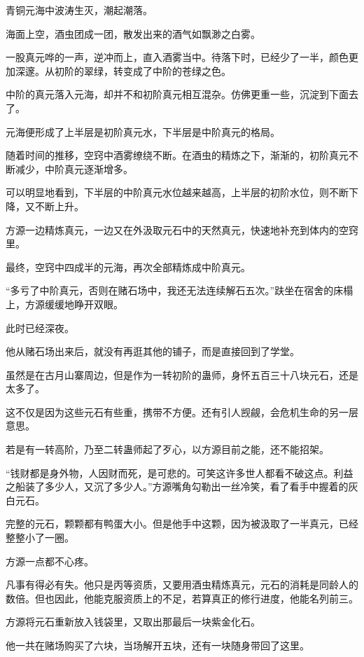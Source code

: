 
\begin{this_body}

青铜元海中波涛生灭，潮起潮落。

海面上空，酒虫团成一团，散发出来的酒气如飘渺之白雾。

一股真元哗的一声，逆冲而上，直入酒雾当中。待落下时，已经少了一半，颜色更加深邃。从初阶的翠绿，转变成了中阶的苍绿之色。

中阶的真元落入元海，却并不和初阶真元相互混杂。仿佛更重一些，沉淀到下面去了。

元海便形成了上半层是初阶真元水，下半层是中阶真元的格局。

随着时间的推移，空窍中酒雾缭绕不断。在酒虫的精炼之下，渐渐的，初阶真元不断减少，中阶真元逐渐增多。

可以明显地看到，下半层的中阶真元水位越来越高，上半层的初阶水位，则不断下降，又不断上升。

方源一边精炼真元，一边又在外汲取元石中的天然真元，快速地补充到体内的空窍里。

最终，空窍中四成半的元海，再次全部精炼成中阶真元。

“多亏了中阶真元，否则在赌石场中，我还无法连续解石五次。”趺坐在宿舍的床榻上，方源缓缓地睁开双眼。

此时已经深夜。

他从赌石场出来后，就没有再逛其他的铺子，而是直接回到了学堂。

虽然是在古月山寨周边，但是作为一转初阶的蛊师，身怀五百三十八块元石，还是太多了。

这不仅是因为这些元石有些重，携带不方便。还有引人觊觎，会危机生命的另一层意思。

若是有一转高阶，乃至二转蛊师起了歹心，以方源目前之能，还不能招架。

“钱财都是身外物，人因财而死，是可悲的。可笑这许多世人都看不破这点。利益之船装了多少人，又沉了多少人。”方源嘴角勾勒出一丝冷笑，看了看手中握着的灰白元石。

完整的元石，颗颗都有鸭蛋大小。但是他手中这颗，因为被汲取了一半真元，已经整整小了一圈。

方源一点都不心疼。

凡事有得必有失。他只是丙等资质，又要用酒虫精炼真元，元石的消耗是同龄人的数倍。但也因此，他能克服资质上的不足，若算真正的修行进度，他能名列前三。

方源将元石重新放入钱袋里，又取出那最后一块紫金化石。

他一共在赌场购买了六块，当场解开五块，还有一块随身带回了这里。


\end{this_body}
